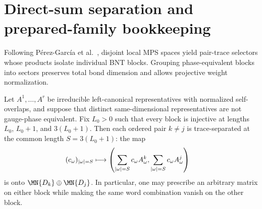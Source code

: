\section{Direct-sum separation and prepared-family bookkeeping}
\label{sec:app_bnt_separation_supplier}

Following Pérez-García et al.~\cite{PerezGarcia2007Matrix}, disjoint local MPS
spaces yield pair-trace selectors whose products isolate individual BNT blocks.
Grouping phase-equivalent blocks into sectors preserves total bond dimension and
allows projective weight normalization.

\begin{lemma}
    \label{lem:bnt_direct_sum_injective_prefix_word_span}
    \leanok
    Let $A^1,\ldots,A^r$ be irreducible left-canonical representatives with
    normalized self-overlaps, and suppose that distinct same-dimensional
    representatives are not gauge-phase equivalent. Fix $L_0>0$ such that
    every block is injective at lengths $L_0$, $L_0+1$, and $3(L_0+1)$.
    Then each ordered pair $k\ne j$ is trace-separated at the common length
    $S=3(L_0+1)$: the map
    \begin{align}
        (c_\omega)_{|\omega|=S}
         & \longmapsto
        \left(\sum_{|\omega|=S}c_\omega A^k_\omega,
        \sum_{|\omega|=S}c_\omega A^j_\omega\right)
        \notag
    \end{align}
    is onto $\MN{D_k}\oplus\MN{D_j}$. In particular, one may prescribe an
    arbitrary matrix on either block while making the same word combination
    vanish on the other block.
\end{lemma}

